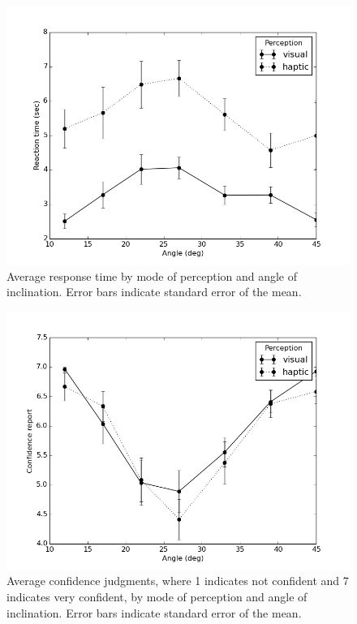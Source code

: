 \documentclass{article}
\begin{document}
\begin{figure}
\includegraphics[scale=0.7]{rt.png}
\caption{\label{fig:rt}Average response time by mode of perception and angle of inclination. Error bars indicate standard error of the mean.}
\end{figure}

\begin{figure}
\includegraphics[scale=0.7]{confidence.png}
\caption{\label{fig:confidence}Average confidence judgments, where 1 indicates not confident and 7 indicates very confident, by mode of perception and angle of inclination. Error bars indicate standard error of the mean.}
\end{figure}
\end{document}
